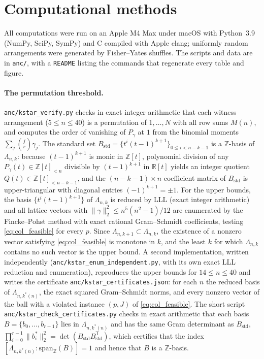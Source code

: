 \documentclass[11pt,a4paper]{article}
\theoremstyle{plain}
\theoremstyle{definition}
\theoremstyle{remark}
\newcommand{\R}{\mathbb{R}}
\newcommand{\Z}{\mathbb{Z}}
\begin{document}
\appendix
\section{Computational methods}
\label{sec:appendix}

All computations were run on an Apple M4 Max under macOS with Python~3.9 (NumPy, SciPy, SymPy) and C compiled with Apple clang; uniformly random arrangements were generated by Fisher--Yates shuffles.
The scripts and data are in \texttt{anc/}, with a \texttt{README} listing the commands that regenerate every table and figure.

\paragraph{The permutation threshold.}
\texttt{anc/kstar\_verify.py} checks in exact integer arithmetic that each witness arrangement ($5\le n\le40$) is a permutation of $1,\dots,N$ with all row sums $M(n)$, and computes the order of vanishing of $P_\gamma$ at $1$ from the binomial moments $\sum_j\binom jr\gamma_j$.
The standard set $B_{\mathrm{std}} = \{t^i(t-1)^{k+1}\}_{0 \le i < n-k-1}$ is a $\Z$-basis of $\Lambda_{n,k}$: because $(t-1)^{k+1}$ is monic in $\Z[t]$, polynomial division of any $P_\gamma(t) \in \Z[t]_{<n}$ divisible by $(t-1)^{k+1}$ in $\R[t]$ yields an integer quotient $Q(t) \in \Z[t]_{<n-k-1}$, and the $(n-k-1)\times n$ coefficient matrix of $B_{\mathrm{std}}$ is upper-triangular with diagonal entries $(-1)^{k+1} = \pm 1$.
For the upper bounds, the basis $\{t^i(t-1)^{k+1}\}$ of $\Lambda_{n,k}$ is reduced by LLL (exact integer arithmetic) and all lattice vectors with $\|\gamma\|_2^2\le n^5(n^2-1)/12$ are enumerated by the Fincke--Pohst method with exact rational Gram--Schmidt coefficients, testing \eqref{eq:col_feasible} for every $p$.
Since $\Lambda_{n,k+1}\subset\Lambda_{n,k}$, the existence of a nonzero vector satisfying \eqref{eq:col_feasible} is monotone in $k$, and the least $k$ for which $\Lambda_{n,k}$ contains no such vector is the upper bound.
A second implementation, written independently (\texttt{anc/kstar\_enum\_independent.py}, with its own exact LLL reduction and enumeration), reproduces the upper bounds for $14\le n\le40$ and writes the certificate \texttt{anc/kstar\_certificates.json}: for each $n$ the reduced basis of $\Lambda_{n,k^*(n)}$, the exact squared Gram--Schmidt norms, and every nonzero vector of the ball with a violated instance $(p,J)$ of \eqref{eq:col_feasible}.
The short script \texttt{anc/kstar\_check\_certificates.py} checks in exact arithmetic that each basis $B = \{b_0,\dots,b_{r-1}\}$ lies in $\Lambda_{n,k^*(n)}$ and has the same Gram determinant as $B_{\mathrm{std}}$, $\prod_{i=0}^{r-1} \|b_i^*\|_2^2 = \det(B_{\mathrm{std}} B_{\mathrm{std}}^{\mathsf T})$, which certifies that the index $[\Lambda_{n,k^*(n)} : \mathrm{span}_\Z(B)] = 1$ and hence that $B$ is a $\Z$-basis.
\end{document}
